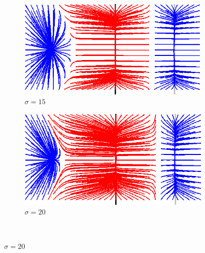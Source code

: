 \begin{appendices}
\begin{figure}[H]
   \begin{subfigure}[c]{.5\linewidth}
     \centering
     \includegraphics[width=\textwidth]{Chapters/Images/m2_sigma_15.png}
     \caption{$\sigma=15$}
   \end{subfigure}   
   \begin{subfigure}[c]{.5\linewidth}
     \centering
     \includegraphics[width=\textwidth]{Chapters/Images/m2_sigma_20.png}
     \caption{$\sigma=20$}
   \end{subfigure}\\
   

\end{figure}
\end{appendices}
